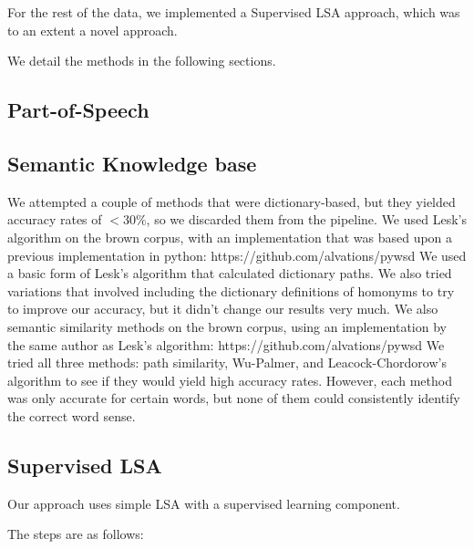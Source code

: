 \documentclass[10pt, letterpaper]{article}
\begin{document}
	 For the rest of the data, we implemented a Supervised LSA approach, which was to
	 an extent a novel approach. 

	 We detail the methods in the following sections. 
 	\subsection{Part-of-Speech}
 	\subsection{Semantic Knowledge base}
        We attempted a couple of methods that were dictionary-based, but they yielded accuracy rates of $ < 30\%$, so we discarded them from the pipeline.
        We used Lesk's algorithm on the brown corpus, with an implementation that was based upon a previous implementation in python: https://github.com/alvations/pywsd We used a basic form of Lesk's algorithm that calculated dictionary paths. We also tried variations that involved including the dictionary definitions of homonyms to try to improve our accuracy, but it didn't change our results very much.
        We also semantic similarity methods on the brown corpus, using an implementation by the same author as Lesk's algorithm: https://github.com/alvations/pywsd  We tried all three methods: path similarity, Wu-Palmer, and Leacock-Chordorow's algorithm to see if they would yield high accuracy rates. However, each method was only accurate for certain words, but none of them could consistently identify the correct word sense.
	\subsection{Supervised LSA}
	Our approach uses simple LSA with a supervised learning component. 

	The steps are as follows: 
\end{document}
